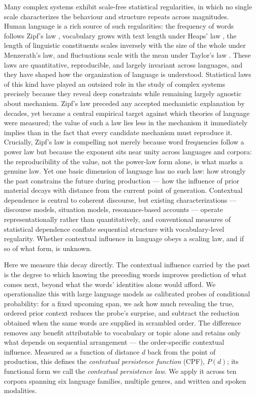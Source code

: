 \documentclass[11pt]{article}
\begin{document}
Many complex systems exhibit scale-free statistical regularities, in which no single
scale characterizes the behaviour and structure repeats across magnitudes. Human
language is a rich source of such regularities: the frequency of words follows Zipf's
law \citep{zipf1949human}, vocabulary grows with text length under Heaps' law
\citep{heaps1978information}, the length of linguistic constituents scales inversely
with the size of the whole under Menzerath's law, and fluctuations scale with the mean
under Taylor's law \citep{altmann2016statistical}. These laws are quantitative,
reproducible, and largely invariant across languages, and they have shaped how the
organization of language is understood. Statistical laws of this kind have played an
outsized role in the study of complex systems precisely because they reveal deep
constraints while remaining largely agnostic about mechanism. Zipf's law preceded any
accepted mechanistic explanation by decades, yet became a central empirical target against
which theories of language were measured; the value of such a law lies less in the
mechanism it immediately implies than in the fact that every candidate mechanism must
reproduce it. Crucially, Zipf's law is compelling not merely because word frequencies follow
a power law but because the exponent sits near unity across languages and corpora: the
reproducibility of the value, not the power-law form alone, is what marks a genuine law. Yet
one basic dimension of language has no such law: how strongly the past
constrains the future during production --- how the
influence of prior material decays with distance from the current point of generation.
Contextual dependence is central to coherent discourse, but existing characterizations
--- discourse models, situation models, resonance-based accounts --- operate
representationally rather than quantitatively, and conventional measures of statistical
dependence conflate sequential structure with vocabulary-level regularity. Whether
contextual influence in language obeys a scaling law, and if so of what form, is
unknown.

Here we measure this decay directly. The contextual influence carried by the past is
the degree to which knowing the preceding words improves prediction of what comes next,
beyond what the words' identities alone would afford. We operationalize this with large
language models as calibrated probes of conditional probability: for a fixed upcoming
span, we ask how much revealing the true, ordered prior context reduces the probe's
surprise, and subtract the reduction obtained when the same words are supplied in
scrambled order. The difference removes any benefit attributable to vocabulary or topic
alone and retains only what depends on sequential arrangement --- the order-specific
contextual influence. Measured as a function of distance $d$ back from the point of
production, this defines the \emph{contextual persistence function} (CPF), $P(d)$; its
functional form we call the \emph{contextual persistence law}. We apply it across ten
corpora spanning six language families, multiple genres, and written and spoken modalities.
\end{document}

